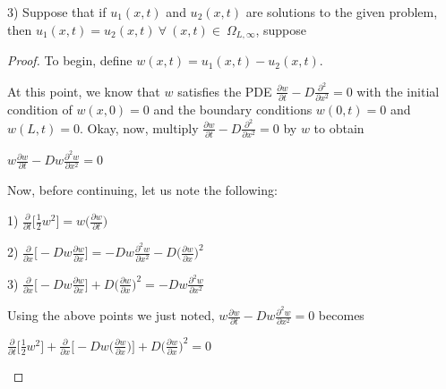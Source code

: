 \documentclass[executivepaper]{article}
\begin{document}
\begin{flushleft}

3) Suppose that if $u_{1}(x,t)$ and $u_{2}(x,t)$ are solutions to the given problem, then $u_{1}(x,t)=u_{2}(x,t) {~} \forall {~} (x,t) \in {~} \Omega_{L,\infty}$, suppose

\begin{proof}

To begin, define $w(x,t)=u_{1}(x,t)-u_{2}(x,t)$. 

\vspace{2mm}

At this point, we know that $w$ satisfies the PDE $\frac{\partial w}{\partial t}-D\frac{\partial^2}{\partial x^2}=0$ with the initial condition of $w(x,0)=0$ and the boundary conditions $w(0,t)=0$ and $w(L,t)=0$. Okay, now, multiply $\frac{\partial w}{\partial t}-D\frac{\partial^2}{\partial x^2}=0$ by $w$ to obtain

\begin{center}

$w\frac{\partial w}{\partial t}-Dw\frac{\partial^2 w}{\partial x^2}=0$

\end{center}

Now, before continuing, let us note the following:

\begin{center}

1) $\frac{\partial}{\partial t}\bigg[\frac{1}{2}w^2\bigg]=w\bigg(\frac{\partial w}{\partial t}\bigg)$

\vspace{2mm}

2) $\frac{\partial}{\partial x}\bigg[-Dw\frac{\partial w}{\partial x}\bigg]=-Dw\frac{\partial^2 w}{\partial x^2}-D\bigg(\frac{\partial w}{\partial x}\bigg)^2$

\vspace{2mm}

3) $\frac{\partial}{\partial x}\bigg[-Dw\frac{\partial w}{\partial x}\bigg]+D\bigg(\frac{\partial w}{\partial x}\bigg)^2=-Dw\frac{\partial^2 w}{\partial x^2}$

\end{center}

Using the above points we just noted, $w\frac{\partial w}{\partial t}-Dw\frac{\partial^2 w}{\partial x^2}=0$ becomes

\begin{center}

$\frac{\partial}{\partial t}\bigg[\frac{1}{2} w^2\bigg]+\frac{\partial}{\partial x}\bigg[-Dw\bigg(\frac{\partial w}{\partial x}\bigg)\bigg]+D\bigg(\frac{\partial w}{\partial x}\bigg)^2=0$


\end{center}
\end{proof}
\end{flushleft}
\end{document}

